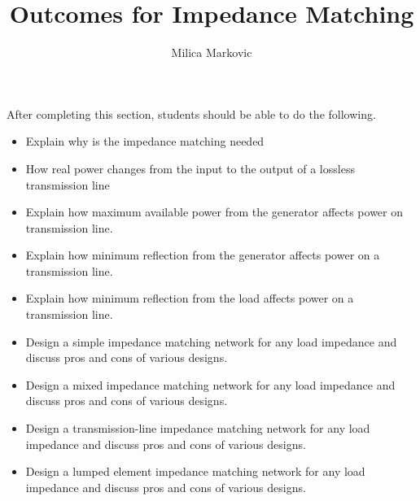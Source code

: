 \documentclass{ximera}
\title{Outcomes for Impedance Matching}
\author{Milica Markovic}
\begin{document}
\begin{abstract}
\end{abstract}

\maketitle

\begin{sectionOutcomes}

After completing this section, students should be able to do the following.

\begin{itemize}
\item Explain why is the impedance matching needed
\item How real power changes from the input to the output of a lossless transmission line
\item Explain how maximum available power from the generator affects power on transmission line.
\item Explain how minimum reflection from the generator affects power on a transmission line.
\item Explain how minimum reflection from the load affects power on a transmission line.
\item Design a simple impedance matching network for any load impedance and discuss pros and cons of various designs.
\item Design a mixed impedance matching network for any load impedance and discuss pros and cons of various designs.
\item Design a transmission-line impedance matching network for any load impedance and discuss pros and cons of various designs.
\item Design a lumped element impedance matching network for any load impedance and discuss pros and cons of various designs.

\end{itemize}

\end{sectionOutcomes}
\end{document}
